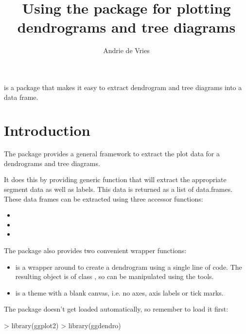 \documentclass[10pt,oneside]{article}
\begin{document}
\pagestyle{empty}

\setlength{\baselineskip}{1.25em}
\setlength{\parskip}{0.5em}
\setlength{\parindent}{0.0em}

\title{Using the \ggdendro{} package for plotting dendrograms and tree diagrams}
\author{Andrie de Vries}
\maketitle{}

\ggdendro{} is a package that makes it easy to extract dendrogram and tree diagrams into a data frame.  

\section{Introduction}

The \ggdendro{} package provides a general framework to extract the plot data for a dendrograms and tree diagrams.

It does this by providing generic function \dendrodata{} that will extract the appropriate segment data as well as labels.  This data is returned as a list of data.frames.  These data frames can be extracted using three accessor functions:

\begin{itemize}
\item {}
\item {}
\item {}
\end{itemize}

The package also provides two convenient wrapper functions:

\begin{itemize}
\item{} is a wrapper around \ggplot{} to create a dendrogram using a single line of code.  The resulting object is of class \ggplot{}, so can be manipulated using the \ggplot{} tools.
\item{} is a \ggplot{} theme with a blank canvas, i.e. no axes, axis labels or tick marks.
\end{itemize}

The  package doesn't get loaded automatically, so remember to load it first: 
  
\begin{Schunk}
\begin{Sinput}
> library(ggplot2)
> library(ggdendro)
\end{Sinput}
\end{Schunk}
\end{document}
